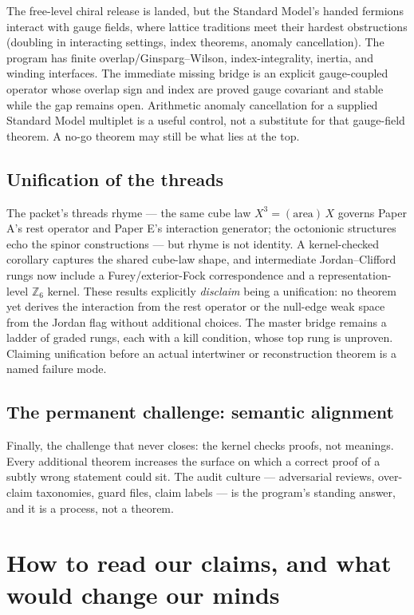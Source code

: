 \documentclass[11pt]{article}
\begin{document}
The free-level chiral release is landed, but the Standard Model's handed
fermions interact with gauge fields, where lattice traditions meet their
hardest obstructions (doubling in interacting settings, index theorems,
anomaly cancellation).  The program has finite overlap/Ginsparg--Wilson,
index-integrality, inertia, and winding interfaces.  The immediate missing
bridge is an explicit gauge-coupled operator whose overlap sign and index are
proved gauge covariant and stable while the gap remains open.  Arithmetic
anomaly cancellation for a supplied Standard Model multiplet is a useful
control, not a substitute for that gauge-field theorem.  A no-go theorem may
still be what lies at the top.

\subsection{Unification of the threads}

The packet's threads rhyme --- the same cube law $X^3=(\text{area})\,X$
governs Paper A's rest operator and Paper E's interaction generator; the
octonionic structures echo the spinor constructions --- but rhyme is not
identity.  A kernel-checked corollary captures the shared cube-law shape,
and intermediate Jordan--Clifford rungs now include a Furey/exterior-Fock
correspondence and a representation-level $\mathbb Z_6$ kernel.  These
results explicitly \emph{disclaim} being a unification: no theorem yet
derives the interaction from the rest operator or the null-edge weak space
from the Jordan flag without additional choices.  The master bridge remains
a ladder of graded rungs, each with a kill condition, whose top rung is
unproven.  Claiming unification before an actual intertwiner or reconstruction
theorem is a named failure mode.

\subsection{The permanent challenge: semantic alignment}

Finally, the challenge that never closes: the kernel checks proofs, not
meanings.  Every additional theorem increases the surface on which a
correct proof of a subtly wrong statement could sit.  The audit culture
--- adversarial reviews, over-claim taxonomies, guard files, claim
labels --- is the program's standing answer, and it is a process, not a
theorem.

\section{How to read our claims, and what would change our minds}
\end{document}
